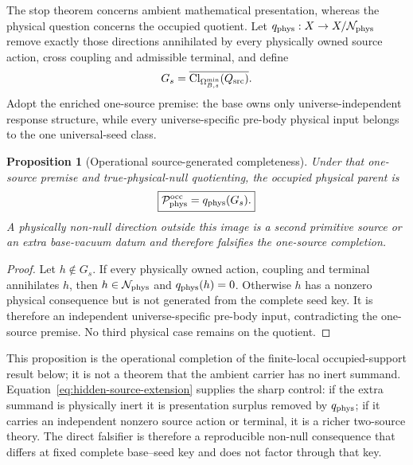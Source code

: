 \documentclass[11pt]{article}
\newtheorem{proposition}{Proposition}
\begin{document}
The stop theorem concerns ambient mathematical presentation, whereas the
physical question concerns the occupied quotient. Let
\(q_{\rm phys}:X\to X/\mathcal N_{\rm phys}\) remove exactly those directions
annihilated by every physically owned source action, cross coupling and
admissible terminal, and define
\begin{equation}
 G_s=\overline{\operatorname{Cl}_{\Omega_{B,s}^{\min}}(Q_{\rm src})}.
 \label{eq:seed-generated-physical-closure}
\end{equation}
Adopt the enriched one-source premise: the base owns only
universe-independent response structure, while every universe-specific
pre-body physical input belongs to the one universal-seed class.

\begin{proposition}[Operational source-generated completeness]
\label{prop:operational-sgc}
Under that one-source premise and true-physical-null quotienting, the occupied
physical parent is
\begin{equation}
 \boxed{\mathcal P_{\rm phys}^{\rm occ}=q_{\rm phys}(G_s).}
 \label{eq:operational-sgc}
\end{equation}
A physically non-null direction outside this image is a second primitive
source or an extra base-vacuum datum and therefore falsifies the one-source
completion.
\end{proposition}

\begin{proof}
Let $h\notin G_s$. If every physically owned action, coupling and terminal
annihilates $h$, then $h\in\mathcal N_{\rm phys}$ and
$q_{\rm phys}(h)=0$. Otherwise $h$ has a nonzero physical consequence but
is not generated from the complete seed key. It is therefore an independent
universe-specific pre-body input, contradicting the one-source premise. No
third physical case remains on the quotient.
\end{proof}

This proposition is the operational completion of the finite-local
occupied-support result below; it is not a theorem that the ambient carrier
has no inert summand. Equation~\eqref{eq:hidden-source-extension} supplies the
sharp control: if the extra summand is physically inert it is presentation
surplus removed by $q_{\rm phys}$; if it carries an independent nonzero
source action or terminal, it is a richer two-source theory. The direct
falsifier is therefore a reproducible non-null consequence that differs at
fixed complete base--seed key and does not factor through that key.
\end{document}
